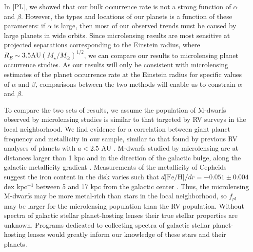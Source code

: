 In \textsection\ref{PL}, we showed that our bulk occurrence rate is not a strong function of $\alpha$ and $\beta$. However, the types and locations of our planets is a function of these parameters: if $\alpha$ is large, then most of our observed trends must be caused by large planets in wide orbits. Since microlensing results are most sensitive at projected separations corresponding to the Einstein radius, where $R_E \sim 3.5 \textrm{AU} (M_\star/M_\odot)^{1/2}$, we can compare our results to microlensing planet occurrence studies. As our results will only be consistent with microlensing estimates of the planet occurrence rate at the Einstein radius for specific values of $\alpha$ and $\beta$, comparisons between the two methods will enable us to constrain $\alpha$ and $\beta$. 

To compare the two sets of results, we assume the population of M-dwarfs observed by microlensing studies is similar to that targeted by RV surveys in the local neighborhood.  We find evidence for a correlation between giant planet frequency and metallicity in our sample, similar to that found by previous RV analyses of planets with $a < 2.5$ AU \citep{Fischer05, JohnsonApps09}. M-dwarfs studied by microlensing are at distances larger than 1 kpc and in the direction of the galactic bulge, along the galactic metallicity gradient \citep{Rolleston00}. Measurements of the metallicity of Cepheids suggest the iron content in the disk varies such that $d\textrm{[Fe/H]}/dr = -0.051 \pm 0.004$ dex kpc$^{-1}$ between 5 and 17 kpc from the galactic center \citep{Pedicelli09}. Thus, the microlensing M-dwarfs may be more metal-rich than stars in the local neighborhood, so $f_{pl}$ may be larger for the microlensing population than the RV population. Without spectra of galactic stellar planet-hosting lenses their true stellar properties are unknown. Programs dedicated to collecting spectra of galactic stellar planet-hosting lenses would greatly inform our knowledge of these stars and their planets.

